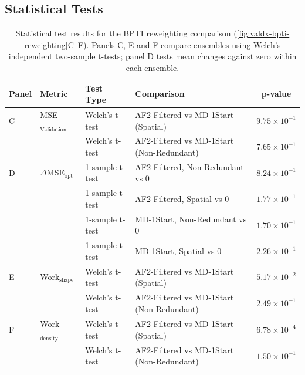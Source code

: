 \clearpage
\subsection{Statistical Tests}
\label{app:valdx-stat-tests}

\begin{table}[htbp]
    \centering
    \small
    \begin{tabular}{@{}llllc@{}}
    \toprule
        \textbf{Panel} & \textbf{Metric} & \textbf{Test Type} & \textbf{Comparison} & \textbf{p-value} \\
        \midrule
        C & MSE$_{\text{Validation}}$ & Welch's t-test & AF2-Filtered vs MD-1Start (Spatial) & $9.75 \times 10^{-1}$ \\
        & & Welch's t-test & AF2-Filtered vs MD-1Start (Non-Redundant) & $7.65 \times 10^{-1}$ \\
        \midrule
        D & $\Delta$MSE$_{\text{opt}}$ & 1-sample t-test & AF2-Filtered, Non-Redundant vs 0 & $8.24 \times 10^{-1}$ \\
        & & 1-sample t-test & AF2-Filtered, Spatial vs 0 & $1.77 \times 10^{-1}$ \\
        & & 1-sample t-test & MD-1Start, Non-Redundant vs 0 & $1.70 \times 10^{-1}$ \\
        & & 1-sample t-test & MD-1Start, Spatial vs 0 & $2.26 \times 10^{-1}$ \\
        \midrule
        E & Work$_{\text{shape}}$ & Welch's t-test & AF2-Filtered vs MD-1Start (Spatial) & $5.17 \times 10^{-2}$ \\
        & & Welch's t-test & AF2-Filtered vs MD-1Start (Non-Redundant) & $2.49 \times 10^{-1}$ \\
        \midrule
        F & Work$_{\text{density}}$ & Welch's t-test & AF2-Filtered vs MD-1Start (Spatial) & $6.78 \times 10^{-4}$ \\
        & & Welch's t-test & AF2-Filtered vs MD-1Start (Non-Redundant) & $1.50 \times 10^{-1}$ \\
        \bottomrule
    \end{tabular}
    \caption{Statistical test results for the BPTI reweighting comparison (\cref{fig:valdx-bpti-reweighting}C--F). Panels C, E and F compare ensembles using Welch's independent two-sample t-tests; panel D tests mean changes against zero within each ensemble.}
    \label{tab:valdx-bpti-tests}
\end{table}

